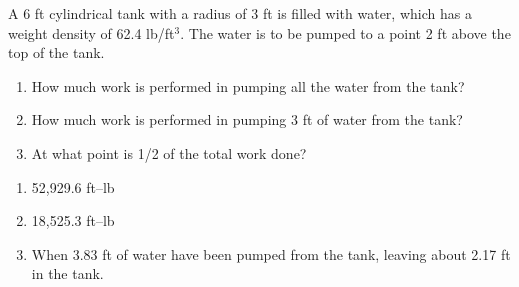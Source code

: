 {A 6 ft cylindrical tank with a radius of 3 ft is filled with water, which has a weight density of 62.4 lb/ft$^3$. The water is to be pumped to a point 2 ft above the top of the tank.
\begin{enumerate}
\item		How much work is performed in pumping all the water from the tank?
\item		How much work is performed in pumping 3 ft of water from the tank?
\item		At what point is 1/2 of the total work done?
\end{enumerate}
}
{\begin{enumerate}
\item	52,929.6 ft--lb
\item	18,525.3 ft--lb
\item	When 3.83 ft of water have been pumped from the tank, leaving about 2.17 ft in the tank.
\end{enumerate}}
